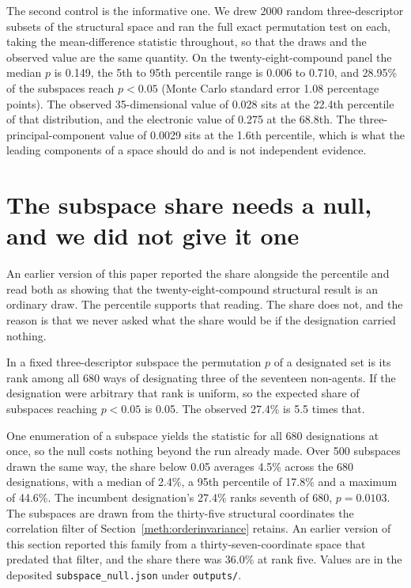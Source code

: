 \documentclass[journal=jacsat,manuscript=suppinfo,margin=1in]{achemso}
\begin{document}
The second control is the informative one. We drew 2000 random three-descriptor
subsets of the structural space and ran the full exact permutation test on each,
taking the mean-difference statistic throughout, so that the draws and the
observed value are the same quantity.
On the twenty-eight-compound panel the median $p$ is 0.149, the 5th to 95th
percentile range is 0.006 to 0.710, and 28.95\% of the subspaces reach $p<0.05$
(Monte Carlo standard error 1.08 percentage points). The observed
35-dimensional value of 0.028 sits at the 22.4th percentile of that
distribution, and the electronic value of 0.275 at the 68.8th. The
three-principal-component value of 0.0029 sits at the 1.6th percentile, which is
what the leading components of a space should do and is not independent
evidence.

\section{The subspace share needs a null, and we did not give it one}
\label{res:subspacenull}

An earlier version of this paper reported the share alongside the percentile
and read both as showing that the twenty-eight-compound structural result is an
ordinary draw. The percentile supports that reading. The share does not, and the
reason is that we never asked what the share would be if the designation carried
nothing.

In a fixed three-descriptor subspace the permutation $p$ of a designated set is
its rank among all 680 ways of designating three of the seventeen non-agents. If
the designation were arbitrary that rank is uniform, so the expected share of
subspaces reaching $p<0.05$ is 0.05. The observed 27.4\% is 5.5 times that.

One enumeration of a subspace yields the statistic for all 680 designations at
once, so the null costs nothing beyond the run already made. Over 500 subspaces
drawn the same way, the share below 0.05 averages 4.5\% across the 680
designations, with a median of 2.4\%, a 95th percentile of 17.8\% and a maximum
of 44.6\%. The incumbent designation's 27.4\% ranks seventh of 680, $p=0.0103$.
The subspaces are drawn from the thirty-five structural coordinates the
correlation filter of Section~\ref{meth:orderinvariance} retains. An earlier
version of this section reported this family from a thirty-seven-coordinate
space that predated that filter, and the share there was 36.0\% at rank five.
Values are in the deposited \texttt{subspace\_null.json} under
\texttt{outputs/}.
\end{document}
